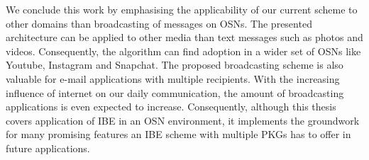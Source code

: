 We conclude this work by emphasising the applicability of our current scheme to other domains than broadcasting of messages on OSNs. The presented architecture can be applied to other media than text messages such as photos and videos. Consequently, the algorithm can find adoption in a wider set of OSNs like Youtube, Instagram and Snapchat. The proposed broadcasting scheme is also valuable for e-mail applications with multiple recipients. With the increasing influence of internet on our daily communication, the amount of broadcasting applications is even expected to increase. Consequently, although this thesis covers application of IBE in an OSN environment, it implements the groundwork for many promising features an IBE scheme with multiple PKGs has to offer in future applications.


